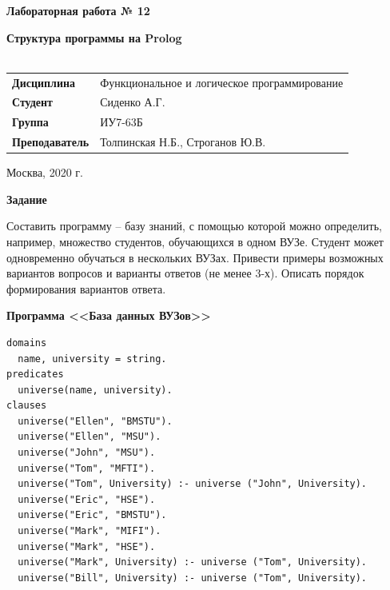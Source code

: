 \documentclass[a4paper,14pt]{extreport} %
\begin{document}
\begin{titlepage}
    \vspace{4cm}

    \begin{center}
        \textbf{Лабораторная работа № 12} \\ 
        \hfill
        
        \textbf{Структура программы на Prolog} \\
        \vspace{0.5cm}
        \textbf{} \\
    \end{center}

    \vspace{4cm}

    \begin{flushleft}
        \begin{tabular}{ll}
            \textbf{Дисциплина} & Функциональное и логическое программирование \\
            \textbf{Студент} & Сиденко А.Г. \\
            \textbf{Группа} & ИУ7-63Б \\
            \textbf{Преподаватель} & Толпинская Н.Б., Строганов Ю.В.  \\
        \end{tabular}
    \end{flushleft}

    \vspace{4cm}

   \begin{center}
        Москва, 2020 г.
    \end{center}

\end{titlepage}

\textbf{Задание}

Составить программу – базу знаний, с помощью которой можно определить, например, множество студентов, обучающихся в одном ВУЗе. Студент может одновременно обучаться в нескольких ВУЗах. Привести примеры возможных вариантов вопросов и варианты ответов (не менее 3-х). Описать порядок формирования вариантов ответа.

\textbf{Программа <<База данных ВУЗов>>}

\begin{lstlisting}
domains
  name, university = string.
predicates
  universe(name, university).
clauses
  universe("Ellen", "BMSTU").
  universe("Ellen", "MSU").
  universe("John", "MSU").
  universe("Tom", "MFTI").
  universe("Tom", University) :- universe ("John", University).
  universe("Eric", "HSE").
  universe("Eric", "BMSTU").
  universe("Mark", "MIFI"). 
  universe("Mark", "HSE"). 
  universe("Mark", University) :- universe ("Tom", University).
  universe("Bill", University) :- universe ("Tom", University). 
\end{lstlisting}
\end{document}
